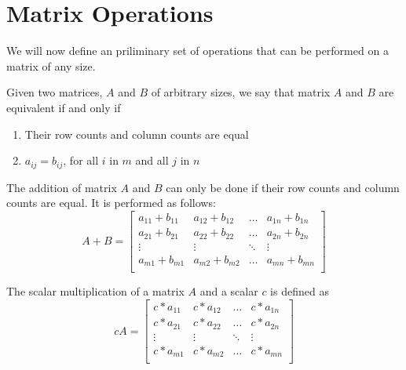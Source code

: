 \section{Matrix Operations}

We will now define an priliminary set of operations that can be performed on a
matrix of any size.

Given two matrices, $A$ and $B$ of arbitrary sizes, we say that matrix $A$ and
$B$ are equivalent if and only if 
\begin{enumerate}
    \item Their row counts and column counts are equal
    \item $a_{ij} = b_{ij}$, for all $i$ in $m$ and all $j$ in $n$
\end{enumerate}

The addition of matrix $A$ and $B$ can only be done if their row counts and
column counts are equal. It is performed as follows:
\begin{equation}
    A+B = 
    \begin{bmatrix}
        a_{11} + b_{11} & a_{12} + b_{12} & \ldots & a_{1n} + b_{1n} \\
        a_{21} + b_{21} & a_{22} + b_{22} & \ldots & a_{2n} + b_{2n} \\
        \vdots & \vdots & \ddots & \vdots \\
        a_{m1} + b_{m1} & a_{m2} + b_{m2} & \ldots & a_{mn} + b_{mn} \\
    \end{bmatrix}
\end{equation}

The scalar multiplication of a matrix $A$ and a scalar $c$ is defined as
\begin{equation}
    cA = 
    \begin{bmatrix}
        c*a_{11} & c*a_{12} & \ldots & c*a_{1n} \\
        c*a_{21} & c*a_{22} & \ldots & c*a_{2n} \\
        \vdots & \vdots & \ddots & \vdots \\
        c*a_{m1} & c*a_{m2} & \ldots & c*a_{mn} \\
    \end{bmatrix}
\end{equation}

